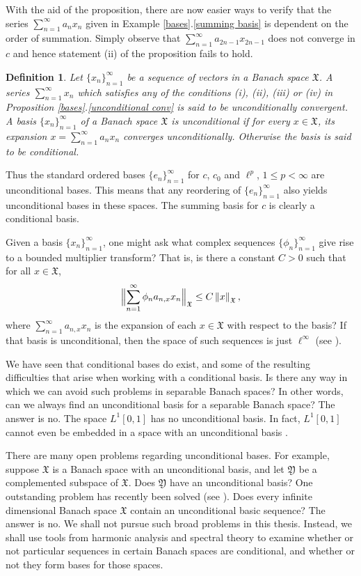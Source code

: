 \documentclass[mstat,12pt]{unswthesis}  %
\newcommand{\X}{\mathfrak{X}}
\newcommand{\Y}{\mathfrak{Y}}
\newcommand{\reff}[2]{\ref{#1}.\ref{#2}}
\def\lp{\ell^p}
\def\norm#1{\left \Vert #1 \right \Vert}
\def\snorm#1{\Bigl \Vert #1 \Bigr \Vert}
\newtheorem{definition}[theorem]{Definition}
\numberwithin{equation}{section}
\begin{document}
With the aid of the proposition, there are now easier ways to verify that the
series
$\sum_{n=1}^{\infty}a_nx_n$ given in Example \reff{bases}{summing basis} is
dependent on the order of summation. Simply observe that
$\sum_{n=1}^{\infty}a_{2n-1}x_{2n-1}$ does not converge in $c$ and hence 
statement (ii) of the proposition fails to hold.

\begin{definition}
Let $\{x_n\}_{n=1}^{\infty}$ be a sequence of vectors in a Banach space $\X$.
A series $\sum_{n=1}^{\infty}x_n$ which satisfies any of the conditions (i),
(ii), (iii) or (iv) in Proposition \reff{bases}{unconditional conv} is said to 
be
{\em unconditionally convergent}. A basis $\{x_n\}_{n=1}^{\infty}$ of a Banach
space $\X$ is {\em unconditional} if for every $x\in\X$, its expansion
$x=\sum_{n=1}^{\infty}a_nx_n$ converges unconditionally. Otherwise the basis is
said to be {\em conditional}.
\end{definition}

Thus the standard ordered bases $\{e_n\}_{n=1}^{\infty}$ for $c$, $c_0$ and
$\lp$,
$1\leq p<\infty$ are unconditional bases. This means that any reordering of
$\{e_n\}_{n=1}^{\infty}$ also yields unconditional bases in these spaces.
The summing basis for $c$ is clearly a conditional basis.

Given a basis $\{x_n\}_{n=1}^{\infty}$, one might ask what
complex sequences $\{\phi_n\}_{n=1}^{\infty}$ give rise to a bounded multiplier
transform? That is, is there a constant $C>0$ such that for all $x\in\X$,
\[\snorm{\sum_{n=1}^{\infty}\phi_na_{n,x}x_n}_{\X}\leq C\norm{x}_{\X},\]
where $\sum_{n=1}^{\infty}a_{n,x}x_n$ is the expansion of each $x\in\X$ with
respect to the basis? If that basis is unconditional, then the space of such
sequences is just $\ell^{\infty}$ (see \cite[Proposition 1.c.7]{Lind}).


We have seen that conditional bases do exist, and some of the resulting
difficulties that arise when working with a conditional basis. Is there any way
in which we can avoid such problems in separable Banach spaces? In other words,
can we always find an unconditional
basis for a separable Banach space? The answer is no. The space $L^1[0,1]$ has
no unconditional basis. In fact, $L^1[0,1]$ cannot even be embedded in a space
with an unconditional basis \cite[Propostion 1.d.1]{Lind}.

There are many open problems regarding unconditional bases. For example,
suppose $\X$ is a Banach space with an unconditional basis, and let $\Y$ be
a complemented subspace of $\X$. Does $\Y$ have an unconditional basis? One
outstanding problem has recently been solved (see \cite{Gowers}).
Does every infinite dimensional Banach space $\X$ contain an unconditional
basic sequence? The answer is no.
We shall not pursue such broad problems in this thesis. Instead, we shall use 
tools from harmonic analysis and spectral theory to examine whether or not
particular sequences in certain Banach spaces are conditional, and whether or 
not
they form bases for those spaces.
\end{document}

